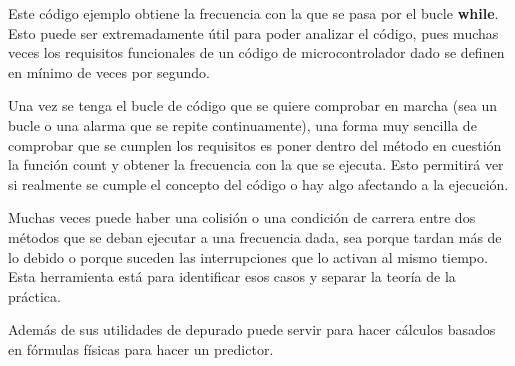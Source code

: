 \documentclass{report}
\begin{document}
Este código ejemplo obtiene la frecuencia con la que se pasa por el bucle \textbf{while}. Esto puede ser extremadamente útil para poder analizar el código, pues muchas veces los requisitos funcionales de un código de microcontrolador dado se definen en mínimo de veces por segundo. \par
Una vez se tenga el bucle de código que se quiere comprobar en marcha (sea un bucle o una alarma que se repite continuamente), una forma muy sencilla de comprobar que se cumplen los requisitos es poner dentro del método en cuestión la función count y obtener la frecuencia con la que se ejecuta. Esto permitirá ver si realmente se cumple el concepto del código o hay algo afectando a la ejecución. \par
Muchas veces puede haber una colisión o una condición de carrera entre dos métodos que se deban ejecutar a una frecuencia dada, sea porque tardan más de lo debido o porque suceden las interrupciones que lo activan al mismo tiempo. Esta herramienta está para identificar esos casos y separar la teoría de la práctica. 
\par \vspace{0.3cm}
Además de sus utilidades de depurado puede servir para hacer cálculos basados en fórmulas físicas para hacer un predictor. 
\end{document}
